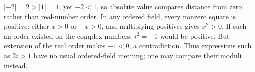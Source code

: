 $|-2|=2>|1|=1 $, yet $-2<1 $, so absolute value compares distance from zero rather than real-number order. In any ordered field, every nonzero square is positive: either $ x>0 $ or $-x>0 $, and multiplying positives gives $ x^2>0 $. If such an order existed on the complex numbers, $ i^2=-1 $ would be positive. But extension of the real order makes $-1<0 $, a contradiction. Thus expressions such as $ 2i>1 $ have no usual ordered-field meaning; one may compare their moduli instead.
